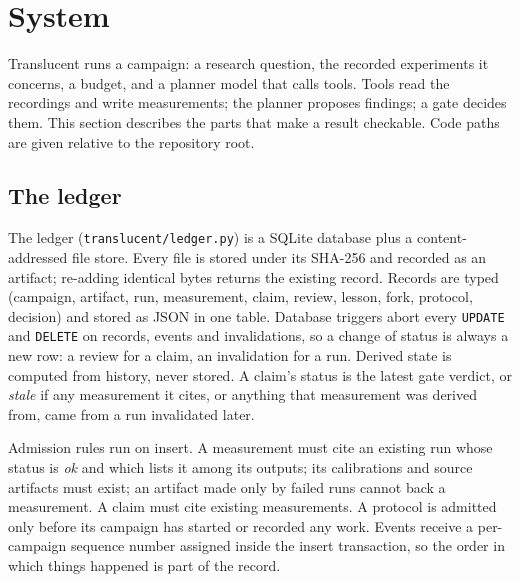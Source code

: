 \documentclass[11pt]{article}
\newcommand{\cmd}[1]{\texttt{#1}}
\begin{document}
\section{System}\label{sec:system}

Translucent runs a campaign: a research question, the recorded experiments it concerns, a budget, and a planner
model that calls tools. Tools read the recordings and write measurements; the planner proposes findings; a gate
decides them. This section describes the parts that make a result checkable. Code paths are given relative to the
repository root.

\subsection{The ledger}
The ledger (\cmd{translucent/ledger.py}) is a SQLite database plus a content-addressed file store. Every file is
stored under its SHA-256 and recorded as an artifact; re-adding identical bytes returns the existing record. Records
are typed (campaign, artifact, run, measurement, claim, review, lesson, fork, protocol, decision) and stored as JSON
in one table. Database triggers abort every \texttt{UPDATE} and \texttt{DELETE} on records, events and
invalidations, so a change of status is always a new row: a review for a claim, an invalidation for a run. Derived
state is computed from history, never stored. A claim's status is the latest gate verdict, or \emph{stale} if any
measurement it cites, or anything that measurement was derived from, came from a run invalidated later.

Admission rules run on insert. A measurement must cite an existing run whose status is \emph{ok} and which lists it
among its outputs; its calibrations and source artifacts must exist; an artifact made only by failed runs cannot back
a measurement. A claim must cite existing measurements. A protocol is admitted only before its campaign has started
or recorded any work. Events receive a per-campaign sequence number assigned inside the insert transaction, so the
order in which things happened is part of the record.
\end{document}
